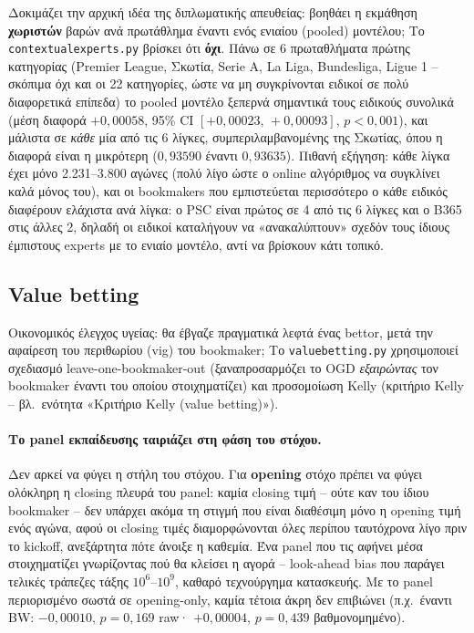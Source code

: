 \documentclass[11pt,a4paper]{article}
\newcommand{\file}[1]{\texttt{#1}}
\renewcommand{\_}{\oldunderscore\allowbreak}
\begin{document}
Δοκιμάζει την αρχική ιδέα της διπλωματικής απευθείας: βοηθάει η εκμάθηση \textbf{χωριστών}
βαρών ανά πρωτάθλημα έναντι ενός ενιαίου (pooled) μοντέλου; Το \file{contextual\_experts.py}
βρίσκει ότι \textbf{όχι}. Πάνω σε 6 πρωταθλήματα πρώτης κατηγορίας (Premier League, Σκωτία,
Serie A, La Liga, Bundesliga, Ligue 1 -- σκόπιμα όχι και οι 22 κατηγορίες, ώστε να μη
συγκρίνονται ειδικοί σε πολύ διαφορετικά επίπεδα) το pooled μοντέλο ξεπερνά σημαντικά τους
ειδικούς συνολικά (μέση διαφορά $+0{,}00058$, 95\% CI $[+0{,}00023,\,+0{,}00093]$,
$p<0{,}001$), και μάλιστα σε \emph{κάθε} μία από τις 6 λίγκες, συμπεριλαμβανομένης της
Σκωτίας, όπου η διαφορά είναι η μικρότερη ($0{,}93590$ έναντι $0{,}93635$).
Πιθανή εξήγηση: κάθε λίγκα έχει μόνο 2.231--3.800 αγώνες (πολύ λίγο ώστε ο online
αλγόριθμος να συγκλίνει καλά μόνος του), και οι bookmakers που εμπιστεύεται περισσότερο ο
κάθε ειδικός διαφέρουν ελάχιστα ανά λίγκα: ο PSC είναι πρώτος σε 4 από τις 6 λίγκες και ο
B365 στις άλλες 2, δηλαδή οι ειδικοί καταλήγουν να «ανακαλύπτουν» σχεδόν τους ίδιους
έμπιστους experts με το ενιαίο μοντέλο, αντί να βρίσκουν κάτι τοπικό.

\subsection{Value betting}
\label{sec:core-algos-value}

Οικονομικός έλεγχος υγείας: θα έβγαζε πραγματικά λεφτά ένας bettor, μετά την αφαίρεση του
περιθωρίου (vig) του bookmaker; Το \file{value\_betting.py} χρησιμοποιεί σχεδιασμό
leave-one-bookmaker-out (ξαναπροσαρμόζει το OGD \emph{εξαιρώντας} τον bookmaker έναντι του
οποίου στοιχηματίζει) και προσομοίωση Kelly (κριτήριο Kelly -- βλ.\ ενότητα «Κριτήριο Kelly
(value betting)»).

\paragraph{Το panel εκπαίδευσης ταιριάζει στη φάση του στόχου.} Δεν αρκεί να φύγει η στήλη
του στόχου. Για \textbf{opening} στόχο πρέπει να φύγει ολόκληρη η closing πλευρά του panel:
καμία closing τιμή -- ούτε καν του ίδιου bookmaker -- δεν υπάρχει ακόμα τη στιγμή που είναι
διαθέσιμη μόνο η opening τιμή ενός αγώνα, αφού οι closing τιμές διαμορφώνονται όλες περίπου
ταυτόχρονα λίγο πριν το kickoff, ανεξάρτητα πότε άνοιξε η καθεμία. Ένα panel που τις αφήνει
μέσα στοιχηματίζει γνωρίζοντας πού θα κλείσει η αγορά -- look-ahead bias που παράγει τελικές
τράπεζες τάξης $10^6$--$10^9$, καθαρό τεχνούργημα κατασκευής. Με το panel περιορισμένο σωστά
σε opening-only, καμία τέτοια άκρη δεν επιβιώνει (π.χ.\ έναντι BW: $-0{,}00010$, $p=0{,}169$
raw· $+0{,}00004$, $p=0{,}439$ βαθμονομημένο).
\end{document}
